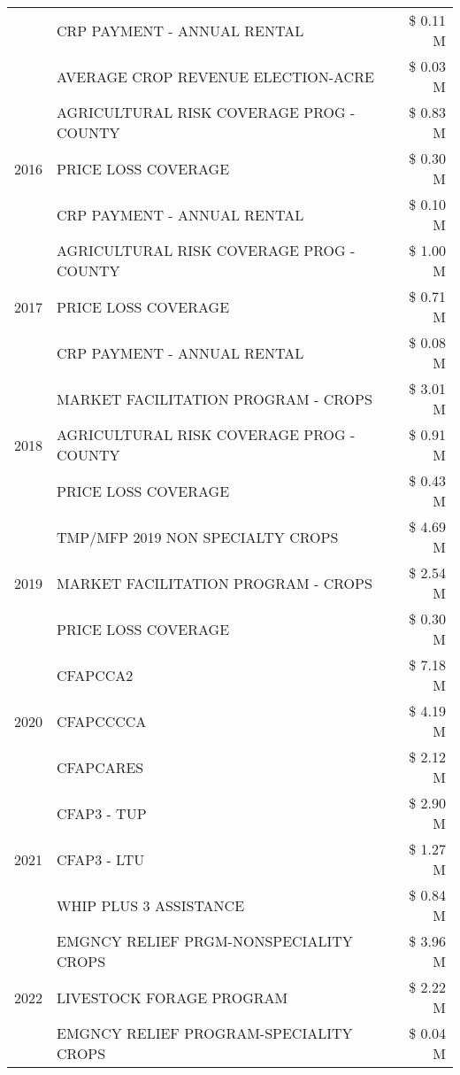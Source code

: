 \begin{tabular}{llr}
 & CRP PAYMENT - ANNUAL RENTAL & \$ 0.11 M \\
 & AVERAGE CROP REVENUE ELECTION-ACRE & \$ 0.03 M \\
\cline{1-3}
\multirow[t]{3}{*}{2016} & AGRICULTURAL RISK COVERAGE PROG - COUNTY & \$ 0.83 M \\
 & PRICE LOSS COVERAGE & \$ 0.30 M \\
 & CRP PAYMENT - ANNUAL RENTAL & \$ 0.10 M \\
\cline{1-3}
\multirow[t]{3}{*}{2017} & AGRICULTURAL RISK COVERAGE PROG - COUNTY & \$ 1.00 M \\
 & PRICE LOSS COVERAGE & \$ 0.71 M \\
 & CRP PAYMENT - ANNUAL RENTAL & \$ 0.08 M \\
\cline{1-3}
\multirow[t]{3}{*}{2018} & MARKET FACILITATION PROGRAM - CROPS & \$ 3.01 M \\
 & AGRICULTURAL RISK COVERAGE PROG - COUNTY & \$ 0.91 M \\
 & PRICE LOSS COVERAGE & \$ 0.43 M \\
\cline{1-3}
\multirow[t]{3}{*}{2019} & TMP/MFP 2019 NON SPECIALTY CROPS & \$ 4.69 M \\
 & MARKET FACILITATION PROGRAM - CROPS & \$ 2.54 M \\
 & PRICE LOSS COVERAGE & \$ 0.30 M \\
\cline{1-3}
\multirow[t]{3}{*}{2020} & CFAPCCA2 & \$ 7.18 M \\
 & CFAPCCCCA & \$ 4.19 M \\
 & CFAPCARES & \$ 2.12 M \\
\cline{1-3}
\multirow[t]{3}{*}{2021} & CFAP3 - TUP & \$ 2.90 M \\
 & CFAP3 - LTU & \$ 1.27 M \\
 & WHIP PLUS 3 ASSISTANCE & \$ 0.84 M \\
\cline{1-3}
\multirow[t]{3}{*}{2022} & EMGNCY RELIEF PRGM-NONSPECIALITY CROPS & \$ 3.96 M \\
 & LIVESTOCK FORAGE PROGRAM & \$ 2.22 M \\
 & EMGNCY RELIEF PROGRAM-SPECIALITY CROPS & \$ 0.04 M \\
\cline{1-3}
\bottomrule
\end{tabular}
